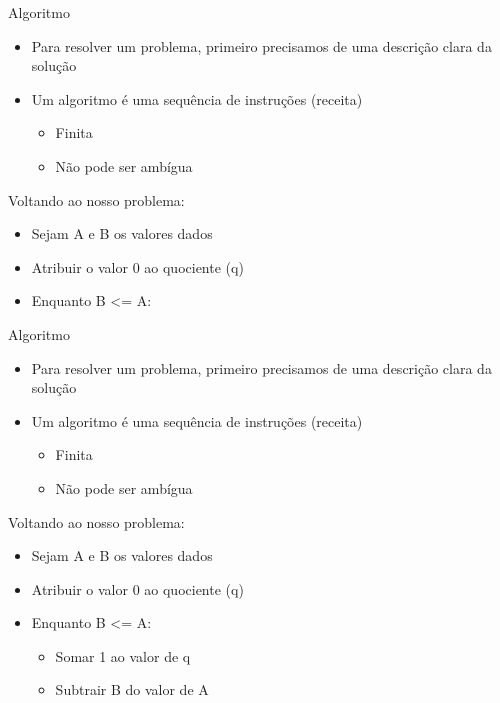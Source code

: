 \documentclass[t, aspectratio=169]{beamer}
\begin{document}
\begin{frame}[label={sec:orgfd3591f}]{Algoritmo}
\begin{itemize}
\item Para resolver um problema, primeiro precisamos de uma descrição clara da solução
\item Um algoritmo é uma sequência de instruções (receita)
\begin{itemize}
\item Finita
\item Não pode ser ambígua
\end{itemize}
\end{itemize}

\alert{Voltando ao nosso problema:}

\begin{itemize}
\item Sejam A e B os valores dados
\item Atribuir o valor 0 ao quociente (q)
\item Enquanto \alert{B <= A}:
\end{itemize}
\end{frame}

\begin{frame}[label={sec:org2588b00}]{Algoritmo}
\begin{itemize}
\item Para resolver um problema, primeiro precisamos de uma descrição clara da solução
\item Um algoritmo é uma sequência de instruções (receita)
\begin{itemize}
\item Finita
\item Não pode ser ambígua
\end{itemize}
\end{itemize}

\alert{Voltando ao nosso problema:}

\begin{itemize}
\item Sejam A e B os valores dados
\item Atribuir o valor 0 ao quociente (q)
\item Enquanto \alert{B <= A}:
\begin{itemize}
\item Somar 1 ao valor de q
\item Subtrair B do valor de A
\end{itemize}
\end{itemize}
\end{frame}
\end{document}
